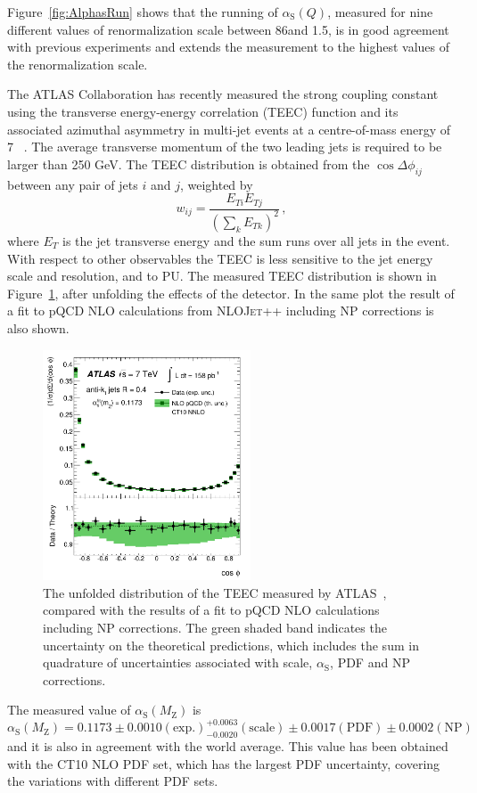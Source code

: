 \documentclass{PoS}
\providecommand{\NLOJETPP} {{\textsc{NLOJet++}}\xspace}
\def\as{\ensuremath{\alpha_\mathrm{S}}\xspace}
\def\asq{\ensuremath{\alpha_\mathrm{S}(Q)}\xspace}
\providecommand{\alpsmz}{\ensuremath{\alpha_\mathrm{S}(M_\mathrm{Z})}\xspace}
\begin{document}
Figure~\ref{fig:AlphasRun} shows that the running of \asq, measured for nine different values of renormalization scale 
between 86\GeV and 1.5\TeV, is in good agreement with previous experiments and extends the measurement to the highest
values of the renormalization scale.

The ATLAS Collaboration has recently measured the strong coupling constant using the transverse energy-energy
correlation (TEEC) function and its associated azimuthal asymmetry in multi-jet events at a
centre-of-mass energy of 7 \TeV~\cite{ATLAS:2015yaa}. The average transverse momentum of the two leading jets is
required to be larger than 250 GeV. The TEEC distribution is obtained from the $\cos\Delta\phi_{ij}$ between any pair of
jets $i$ and $j$, weighted by $$w_{ij} = \frac{E_{Ti}E_{Tj}}{(\sum_k E_{Tk})^2} \, ,$$ where $E_T$ is the jet transverse
energy and the sum runs over all jets in the event. With respect to other observables the TEEC is less sensitive to the jet energy scale and resolution,
and to PU. The measured TEEC distribution is shown in Figure~\ref{fig:TEEC}, after unfolding the effects of
the detector. In the same plot the result of a fit to pQCD NLO calculations from \NLOJETPP including NP
corrections is also shown. 
\begin{figure}[tpb]
  \centering
  \includegraphics[width=0.55\textwidth]{Figure5.pdf}
  \caption{The unfolded distribution of the TEEC measured by ATLAS~\cite{ATLAS:2015yaa}, compared with the results of a fit to
    pQCD NLO calculations including NP corrections. The green shaded band indicates the uncertainty on the
    theoretical predictions, which includes the sum in quadrature of uncertainties associated with scale, \as, PDF and
    NP corrections.}
  \label{fig:TEEC}
\end{figure}
The measured value of \alpsmz is 
$$ \alpsmz  = 0.1173 \pm 0.0010 \mathrm{(exp.)} ^{+0.0063}_{-0.0020} \mathrm{(scale)} \pm 0.0017 \mathrm{(PDF)} \pm
0.0002 \mathrm{(NP)} \, $$
and it is also in agreement with the world average. This value has been obtained with the CT10 NLO PDF set, which has
the largest PDF uncertainty, covering the variations with different PDF sets.
\end{document}
